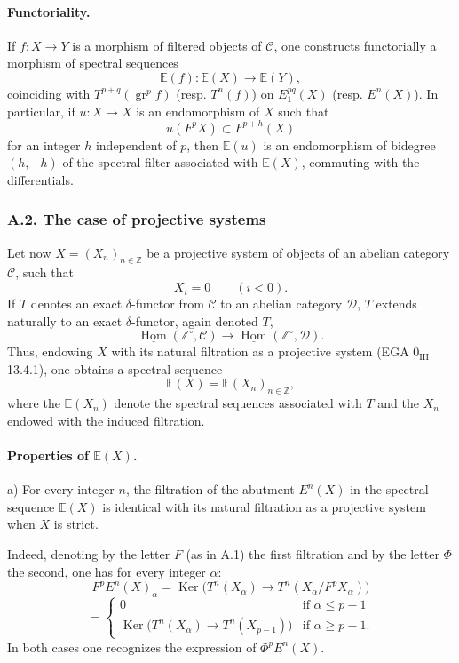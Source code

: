 \documentclass[11pt]{article}
\providecommand{\uHom}{\underline{\Hom}}
\DeclareMathOperator{\Hom}{Hom}
\providecommand{\Ker}{\operatorname{Ker}}
\providecommand{\gr}{\operatorname{gr}}
\providecommand{\Hom}{\operatorname{Hom}}
\providecommand{\Ker}{\operatorname{Ker}}
\providecommand{\gr}{\operatorname{gr}}
\providecommand{\gr}{\operatorname{gr}}
\providecommand{\Ker}{\operatorname{Ker}}
\providecommand{\Hom}{\operatorname{Hom}}
\begin{document}
\paragraph{Functoriality.}
If \(f:X\to Y\) is a morphism of filtered objects of \(\mathcal C\), one constructs functorially a morphism of spectral sequences
\[
\mathbb{E}(f):\mathbb{E}(X)\longrightarrow \mathbb{E}(Y),
\]
coinciding with \(T^{p+q}(\gr^p f)\) (resp. \(T^n(f)\)) on \(E_1^{pq}(X)\) (resp. \(E^n(X)\)). In particular, if \(u:X\to X\) is an endomorphism of \(X\) such that
\[
u(F^pX)\subset F^{p+h}(X)
\]
for an integer \(h\) independent of \(p\), then \(\mathbb{E}(u)\) is an endomorphism of bidegree \((h,-h)\) of the spectral filter associated with \(\mathbb{E}(X)\), commuting with the differentials.

\subsubsection*{A.2. The case of projective systems}
Let now \(X=(X_n)_{n\in\mathbb Z}\) be a projective system of objects of an abelian category \(\mathcal C\), such that
\[
X_i=0\qquad(i<0).
\]
If \(T\) denotes an exact \(\delta\)-functor from \(\mathcal C\) to an abelian category \(\mathcal D\), \(T\) extends naturally to an exact \(\delta\)-functor, again denoted \(T\),
\[
\uHom(\mathbb Z^\circ,\mathcal C)\longrightarrow \uHom(\mathbb Z^\circ,\mathcal D).
\]
Thus, endowing \(X\) with its natural filtration as a projective system (EGA \(0_{\mathrm{III}}\) 13.4.1), one obtains a spectral sequence
\[
\mathbb{E}(X)=\mathbb{E}(X_n)_{n\in\mathbb Z},
\]
where the \(\mathbb{E}(X_n)\) denote the spectral sequences associated with \(T\) and the \(X_n\) endowed with the induced filtration.

\paragraph{Properties of \(\mathbb{E}(X)\).}
a) For every integer \(n\), the filtration of the abutment \(E^n(X)\) in the spectral sequence \(\mathbb{E}(X)\) is identical with its natural filtration as a projective system when \(X\) is strict.

Indeed, denoting by the letter \(F\) (as in A.1) the first filtration and by the letter \(\Phi\) the second, one has for every integer \(\alpha\):
\[
F^pE^n(X)_\alpha
=\Ker\bigl(T^n(X_\alpha)\longrightarrow T^n(X_\alpha/F^pX_\alpha)\bigr)
\]
\[
=
\begin{cases}
0 & \text{if } \alpha\le p-1\\
\Ker\bigl(T^n(X_\alpha)\longrightarrow T^n(X_{p-1})\bigr) & \text{if } \alpha\ge p-1.
\end{cases}
\]
In both cases one recognizes the expression of \(\Phi^pE^n(X)\).
\end{document}
